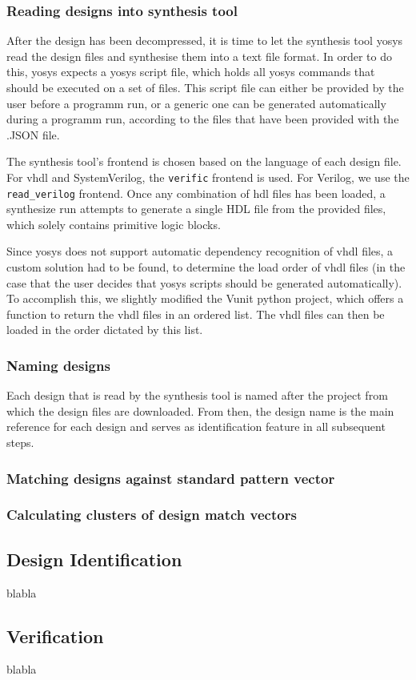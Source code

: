 \subsubsection{Reading designs into synthesis tool} 
After the design has been decompressed, it is time to let the synthesis tool 
yosys read the design files and synthesise them into a text file format. In 
order to do this, yosys expects a yosys script file, which holds all yosys commands 
that should be executed on a set of files. This script file can either be provided
by the user before a programm run, or a generic one can be generated automatically 
during a programm run, according to the files that have been provided with the 
.JSON file. 

The synthesis tool's frontend is chosen based on the language of each design file.
For \gls{vhdl} and SystemVerilog, the \lstinline{verific} frontend is used. For Verilog,
we use the \lstinline{read_verilog} frontend. Once any combination of \gls{hdl} files
has been loaded, a synthesize run attempts to generate a single HDL file from the provided
files, which solely contains primitive logic blocks. 

Since yosys does not support automatic dependency recognition of vhdl files, a custom solution
had to be found, to determine the load order of vhdl files (in the case that the user decides
that yosys scripts should be generated automatically). To accomplish this, we slightly modified 
the Vunit python project, which offers a function to return the \gls{vhdl} 
files in an ordered list. The vhdl files can then be loaded in the order dictated by this list.  

\subsubsection{Naming designs} 
Each design that is read by the synthesis tool is named after the project from
which the design files are downloaded. From then, the design name is the main
reference for each design and serves as identification feature in all
subsequent steps.

\subsubsection{Matching designs against standard pattern vector}
\subsubsection{Calculating clusters of design match vectors}

\subsection{Design Identification}
blabla

\subsection{Verification}
blabla



